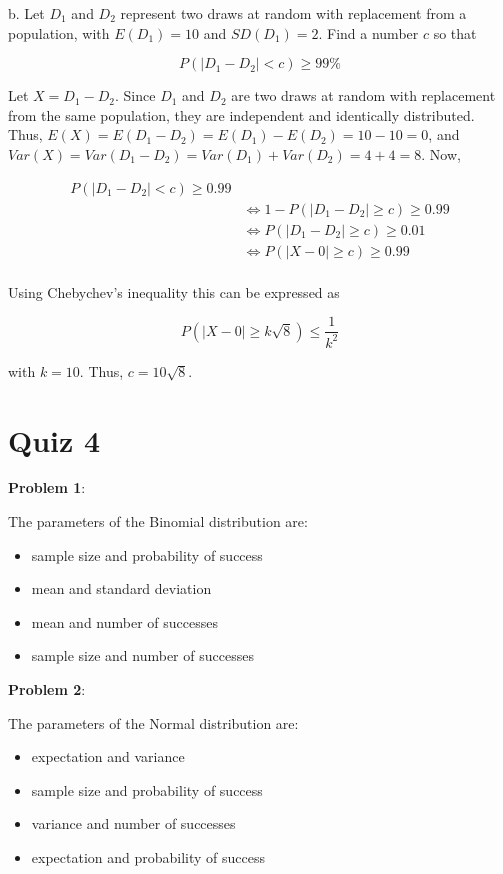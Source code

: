 \documentclass{article}
\begin{document}
\indent\indent b. Let $D_1$ and $D_2$ represent two draws at random with replacement from a population, with $E(D_1)=10$ and $SD(D_1)=2$. Find a number $c$ so that

\[P(|D_1-D_2|<c)\ge99\%\]

{\color{blue}

Let $X=D_1-D_2$. Since $D_1$ and $D_2$ are two draws at random with replacement from the same population, they are independent and identically distributed. Thus, $E(X)=E(D_1-D_2)=E(D_1)-E(D_2)=10-10=0$, and $Var(X)=Var(D_1-D_2)=Var(D_1)+Var(D_2)=4+4=8$. Now,

\begin{align*}
    P(|D_1-D_2|<c)\ge0.99&\\
    &\Leftrightarrow1-P(|D_1-D_2|\ge c)\ge0.99\\
    &\Leftrightarrow P(|D_1-D_2|\ge c)\ge0.01\\
    &\Leftrightarrow P(|X-0|\ge c)\ge0.99\\
\end{align*}

Using Chebychev's inequality this can be expressed as

\[P(|X-0|\ge k\sqrt{8})\le\frac{1}{k^2}\]

with $k=10$. Thus, $c=10\sqrt{8}$.

}

\section{Quiz 4}

\noindent\textbf{Problem 1}:

The parameters of the Binomial distribution are:

\begin{itemize}
    \item {\color{blue}sample size and probability of success}
    \item mean and standard deviation
    \item mean and number of successes
    \item sample size and number of successes
\end{itemize}

\noindent\textbf{Problem 2}:

The parameters of the Normal distribution are:

\begin{itemize}
    \item {\color{blue}expectation and variance}
    \item sample size and probability of success
    \item variance and number of successes
    \item expectation and probability of success
\end{itemize}
\end{document}
